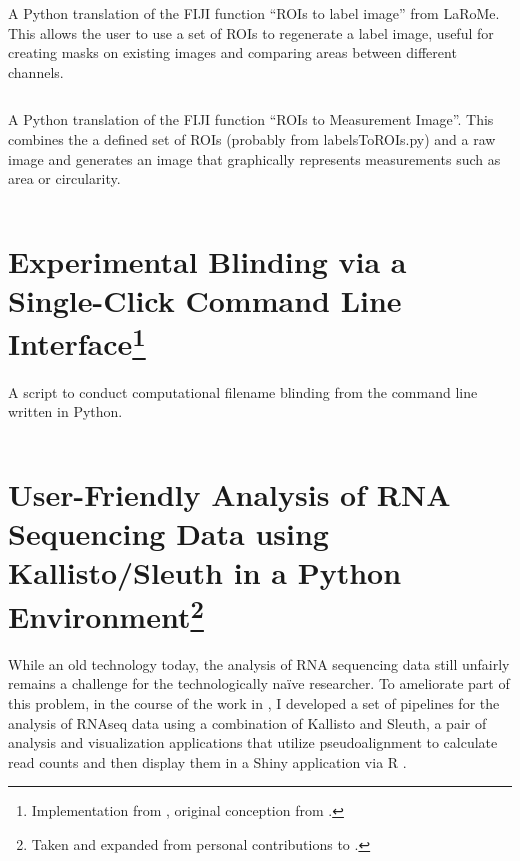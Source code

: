 \begin{code}
\caption{A Python translation of the FIJI function ``ROIs to label image'' from LaRoMe. This allows the user to use a set of ROIs to regenerate a label image, useful for creating masks on existing images and comparing areas between different channels.}
\label{r2l}

\inputminted[breaklines,frame=single]{python}{source/ROIsTolabels.py}

\end{code}

\begin{code}
\caption{A Python translation of the FIJI function ``ROIs to Measurement Image''. This combines the a defined set of ROIs (probably from labelsToROIs.py) and a raw image and generates an image that graphically represents measurements such as area or circularity.}
\label{r2m}

\inputminted[breaklines,frame=single]{python}{source/ROIsToMap}

\end{code}


\section[Experimental Blinding via a Single-Click Command Line Interface]{Experimental Blinding via a Single-Click Command Line Interface\footnote{Implementation from \citet{Brewer2022}, original conception from \citet{Salter2016}.}}\label{blinders}

\begin{code}
\caption{A script to conduct computational filename blinding from the command line written in Python.}
\label{blinder}

\inputminted[breaklines,frame=single]{python}{source/renamer.py}

\end{code}

\section[User-Friendly Analysis of RNA Sequencing Data using Kallisto/Sleuth in a Python Environment]{User-Friendly Analysis of RNA Sequencing Data using Kallisto/Sleuth in a Python Environment\footnote{Taken and expanded from personal contributions to \citet{Saelens2022}.}}\label{rnaseq}

While an old technology today, the analysis of RNA sequencing data still unfairly remains a challenge for the technologically na\"{i}ve researcher. To ameliorate part of this problem, in the course of the work in \citet{Saelens2022}, I developed a set of pipelines for the analysis of RNAseq data using a combination of Kallisto and Sleuth, a pair of analysis and visualization applications that utilize pseudoalignment to calculate read counts and then display them in a Shiny application via R \citep{Pimentel2017}.

